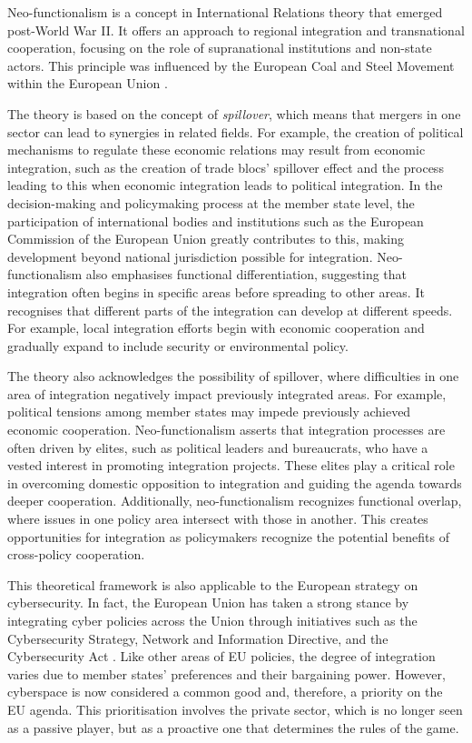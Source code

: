 Neo-functionalism is a concept in International Relations theory that emerged post-World War II. It offers an approach to regional integration and transnational cooperation, focusing on the role of supranational institutions and non-state actors. This principle was influenced by the European Coal and Steel Movement within the European Union \autocite{dunn_2013_neofunctionalism}.

The theory is based on the concept of \textit{spillover}, which means that mergers in one sector can lead to synergies in related fields. For example, the creation of political mechanisms to regulate these economic relations may result from economic integration, such as the creation of trade blocs' spillover effect and the process leading to this when economic integration leads to political integration. In the decision-making and policymaking process at the member state level, the participation of international bodies and institutions such as the European Commission of the European Union greatly contributes to this, making development beyond national jurisdiction possible for integration. Neo-functionalism also emphasises functional differentiation, suggesting that integration often begins in specific areas before spreading to other areas. It recognises that different parts of the integration can develop at different speeds. For example, local integration efforts begin with economic cooperation and gradually expand to include security or environmental policy.

The theory also acknowledges the possibility of spillover, where difficulties in one area of integration negatively impact previously integrated areas. For example, political tensions among member states may impede previously achieved economic cooperation. Neo-functionalism asserts that integration processes are often driven by elites, such as political leaders and bureaucrats, who have a vested interest in promoting integration projects. These elites play a critical role in overcoming domestic opposition to integration and guiding the agenda towards deeper cooperation. Additionally, neo-functionalism recognizes functional overlap, where issues in one policy area intersect with those in another. This creates opportunities for integration as policymakers recognize the potential benefits of cross-policy cooperation.

This theoretical framework is also applicable to the European strategy on cybersecurity. In fact, the European Union has taken a strong stance by integrating cyber policies across the Union through initiatives such as the Cybersecurity Strategy, Network and Information Directive, and the Cybersecurity Act \autocite{kasper_2020_towards}. Like other areas of EU policies, the degree of integration varies due to member states' preferences and their bargaining power. However, cyberspace is now considered a common good and, therefore, a priority on the EU agenda. This prioritisation involves the private sector, which is no longer seen as a passive player, but as a proactive one that determines the rules of the game.

